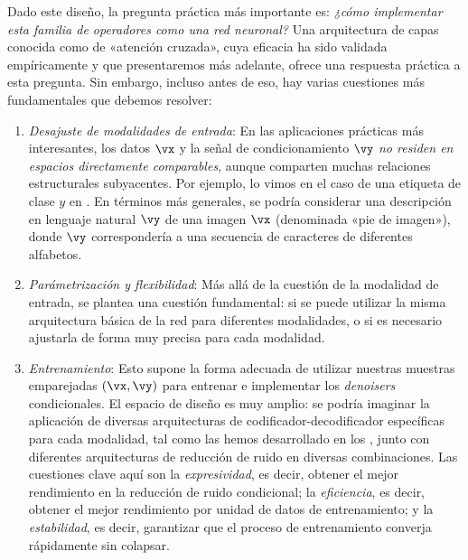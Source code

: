 \documentclass[../../book-main_es.tex]{subfiles}
\begin{document}
Dado este diseño, la pregunta práctica más importante es: \textit{¿cómo
implementar esta familia de operadores como una red neuronal?}
Una arquitectura de capas conocida como de «atención cruzada», cuya eficacia ha sido validada empíricamente
y que presentaremos más adelante, ofrece una respuesta práctica
a esta pregunta. Sin embargo, incluso antes de eso, hay varias cuestiones más fundamentales
que debemos resolver:
\begin{enumerate}
    \item \textit{Desajuste de modalidades de entrada}: En las aplicaciones prácticas más interesantes,
        los datos $\vx$ y la señal de condicionamiento $\vy$
        \textit{no residen en espacios directamente comparables}, aunque comparten
        muchas relaciones estructurales subyacentes. Por ejemplo, lo vimos en
        el caso de una etiqueta de clase $y$ en . En términos más generales,
        se podría considerar una descripción en lenguaje natural $\vy$ de una imagen $\vx$
        (denominada «pie de imagen»), donde $\vy$ correspondería a
        una secuencia de caracteres de diferentes alfabetos.
    \item \textit{Parámetrización y flexibilidad}: Más allá de la cuestión de la
        modalidad de entrada, se plantea una cuestión fundamental: si se puede utilizar la misma
        arquitectura básica de la red para diferentes modalidades,
        o si es necesario ajustarla de forma muy precisa para cada modalidad.
    \item \textit{Entrenamiento}: Esto supone la forma adecuada de utilizar nuestras muestras emparejadas
        $(\vx, \vy)$ para entrenar e implementar los \textit{denoisers} condicionales. El
        espacio de diseño es muy amplio: se podría imaginar la aplicación de diversas
        arquitecturas de codificador-decodificador específicas para cada modalidad, tal como las hemos desarrollado en
        los , junto con
        diferentes arquitecturas de reducción de ruido en diversas combinaciones. Las cuestiones clave
        aquí son la \textit{expresividad}, es decir, obtener el mejor
        rendimiento en la reducción de ruido condicional; la \textit{eficiencia}, es decir, obtener el mejor
        rendimiento por unidad de datos de entrenamiento; y la \textit{estabilidad},
        es decir, garantizar que el proceso de entrenamiento converja rápidamente sin
        colapsar.
\end{enumerate}
\end{document}
